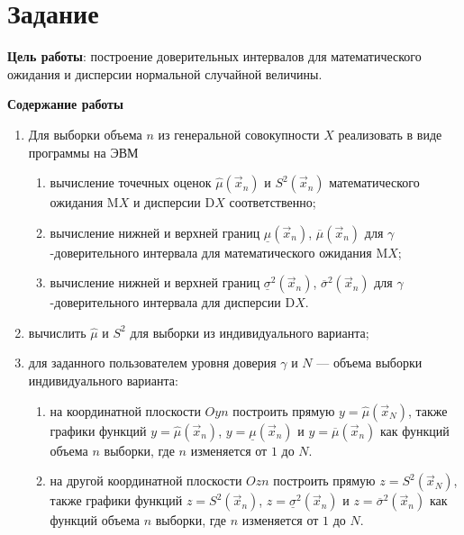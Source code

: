\chapter{Задание}

\textbf{Цель работы}: построение доверительных интервалов для математического
ожидания и дисперсии нормальной случайной величины.

\textbf{Содержание работы}

\begin{enumerate}
	\item Для выборки объема $n$ из генеральной совокупности $X$ реализовать в
	виде программы на ЭВМ
	\begin{enumerate}[label=\asbuk*)]
		\item вычисление точечных оценок $\hat \mu(\vec x_n)$ и $S^2(\vec x_n)$ математического ожидания $\mathrm{M}X$ и дисперсии $\mathrm{D}X$ соответственно;
		\item вычисление нижней и верхней границ $\underline \mu (\vec
		x_n)$, $\overline \mu (\vec x_n)$ для \mbox{$\gamma$-доверительного} интервала для математического ожидания $\mathrm{M}X$;
		\item вычисление нижней и верхней границ $\underline \sigma^2 (\vec x_n)$, $\overline \sigma^2 (\vec x_n)$ для
		\mbox{$\gamma$-доверительного} интервала для дисперсии $\mathrm{D}X$.
	\end{enumerate}
	\item вычислить $\hat \mu$ и $S^2$ для выборки из индивидуального варианта;
	\item для заданного пользователем уровня доверия $\gamma$ и $N$ --- объема выборки индивидуального варианта:
	\begin{enumerate}[label=\asbuk*)]
		\item на координатной плоскости $Oyn$ построить прямую $y=\hat \mu (\vec x_N)$, также графики функций $y=\hat \mu (\vec x_n)$, $y=\underline \mu (\vec x_n)$ и $y=\overline \mu (\vec x_n)$ как функций объема $n$ выборки, где $n$ изменяется от $1$ до $N$.
		\item на другой координатной плоскости $Ozn$ построить прямую \mbox{$z=S^2 (\vec x_N)$}, также графики функций $z=S^2 (\vec x_n)$, $z=\underline \sigma^2 (\vec x_n)$ и \mbox{$z=\overline \sigma^2 (\vec x_n)$} как функций объема $n$ выборки, где $n$ изменяется от $1$ до $N$.
	\end{enumerate}
	
\end{enumerate}